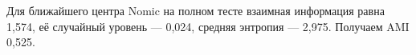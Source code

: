 Для ближайшего центра Nomic на полном тесте взаимная информация равна 1,574, её случайный уровень --- 0,024, средняя энтропия --- 2,975. Получаем AMI 0,525.
